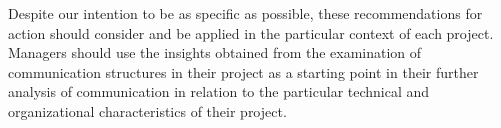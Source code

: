\documentclass[12pt,oneside]{book}
\begin{document}
Despite our intention to be as specific as possible, these 
recommendations for action should consider and be applied in the
particular context of each project. Managers should use the
insights obtained from the examination of communication structures in their
project as a starting point in their further analysis of 
communication in relation to the particular technical and
organizational characteristics of their project.





\end{document}
